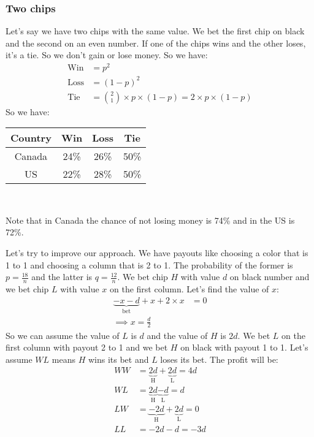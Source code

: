 \documentclass{book}
\begin{document}
	\subsubsection{Two chips}
	Let's say we have two chips with the same value. We bet the first chip on black and the second on an even number. If one of the chips wins and the other loses, it's a tie. So we don't gain or lose money. So we have:
	\begin{equation*}
		\begin{split}
			\text{Win} &= p^2 \\
			\text{Loss} &= (1 - p)^2 \\
			\text{Tie} &= \binom{2}{1} \times p \times (1 - p) = 2 \times p \times (1 - p)
		\end{split}
	\end{equation*}
	So we have: \\
	\par 
	\begin{tabular}[h!]{c c c c}
		\toprule
		Country & Win & Loss & Tie \\
		\midrule
		Canada & 24\% & 26\% & 50\% \\
		US & 22\% & 28\% & 50\% \\
		\bottomrule
	\end{tabular} \\
	\par Note that in Canada the chance of not losing money is 74\% and in the US is 72\%.
	\par Let's try to improve our approach. We have payouts like choosing a color that is 1 to 1 and choosing a column that is 2 to 1. The probability of the former is $p = \frac{18}{n}$ and the latter is $q = \frac{12}{n}$. We bet chip $H$ with value $d$ on black number and we bet chip $L$ with value $x$ on the first column. Let's find the value of $x$:
	\begin{equation*}
		\begin{split}
			\underbrace{-x -d}_\text{bet} + x + 2 \times x &= 0 \\
			\implies x = \frac{d}{2}			
		\end{split}
	\end{equation*}
	So we can assume the value of $L$ is $d$ and the value of $H$ is $2d$. We bet $L$ on the first column with payout 2 to 1 and we bet $H$ on black with payout 1 to 1. Let's assume $WL$ means $H$ wins its bet and $L$ loses its bet. The profit will be:
	\begin{equation*}
		\begin{split}
			WW &= \underbrace{2d}_\text{H} + \underbrace{2d}_\text{L} = 4d \\
			WL &= \underbrace{2d}_\text{H} \underbrace{-d}_\text{L} = d \\
			LW &= \underbrace{-2d}_\text{H} + \underbrace{2d}_\text{L} = 0 \\
			LL &= -2d - d = -3d
		\end{split}
	\end{equation*}
\end{document}
